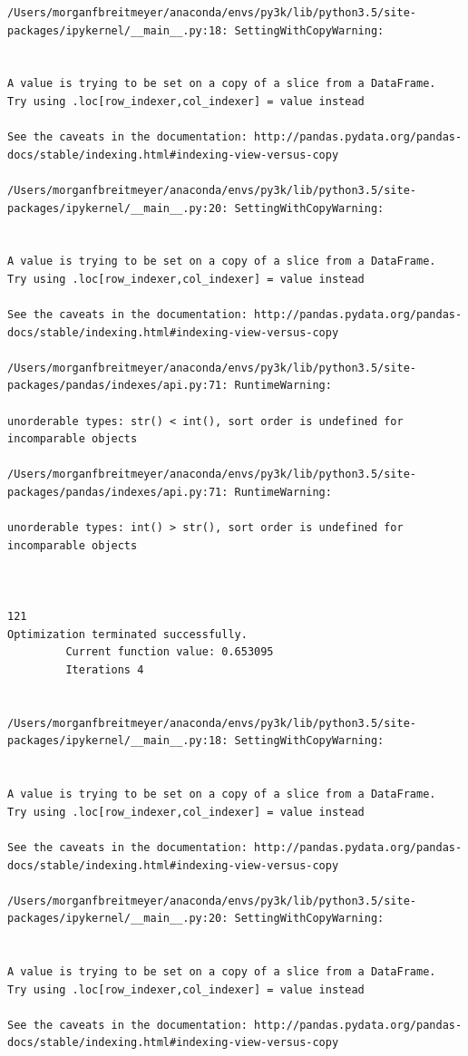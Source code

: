 \begin{lstlisting}
/Users/morganfbreitmeyer/anaconda/envs/py3k/lib/python3.5/site-packages/ipykernel/__main__.py:18: SettingWithCopyWarning:


A value is trying to be set on a copy of a slice from a DataFrame.
Try using .loc[row_indexer,col_indexer] = value instead

See the caveats in the documentation: http://pandas.pydata.org/pandas-docs/stable/indexing.html#indexing-view-versus-copy

/Users/morganfbreitmeyer/anaconda/envs/py3k/lib/python3.5/site-packages/ipykernel/__main__.py:20: SettingWithCopyWarning:


A value is trying to be set on a copy of a slice from a DataFrame.
Try using .loc[row_indexer,col_indexer] = value instead

See the caveats in the documentation: http://pandas.pydata.org/pandas-docs/stable/indexing.html#indexing-view-versus-copy

/Users/morganfbreitmeyer/anaconda/envs/py3k/lib/python3.5/site-packages/pandas/indexes/api.py:71: RuntimeWarning:

unorderable types: str() < int(), sort order is undefined for incomparable objects

/Users/morganfbreitmeyer/anaconda/envs/py3k/lib/python3.5/site-packages/pandas/indexes/api.py:71: RuntimeWarning:

unorderable types: int() > str(), sort order is undefined for incomparable objects



121
Optimization terminated successfully.
         Current function value: 0.653095
         Iterations 4


/Users/morganfbreitmeyer/anaconda/envs/py3k/lib/python3.5/site-packages/ipykernel/__main__.py:18: SettingWithCopyWarning:


A value is trying to be set on a copy of a slice from a DataFrame.
Try using .loc[row_indexer,col_indexer] = value instead

See the caveats in the documentation: http://pandas.pydata.org/pandas-docs/stable/indexing.html#indexing-view-versus-copy

/Users/morganfbreitmeyer/anaconda/envs/py3k/lib/python3.5/site-packages/ipykernel/__main__.py:20: SettingWithCopyWarning:


A value is trying to be set on a copy of a slice from a DataFrame.
Try using .loc[row_indexer,col_indexer] = value instead

See the caveats in the documentation: http://pandas.pydata.org/pandas-docs/stable/indexing.html#indexing-view-versus-copy


\end{lstlisting}
